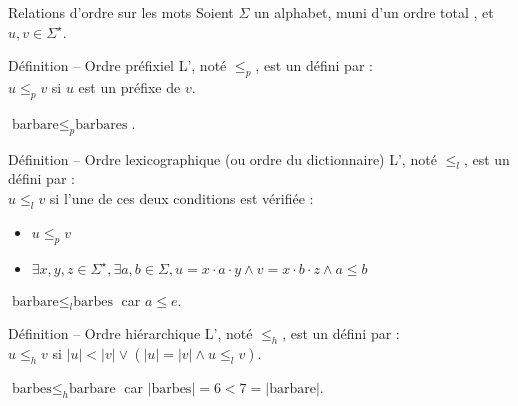 
\begingroup

\begin{frame}{Relations d'ordre sur les mots}
  \vspace{-1mm}
  Soient $\Sigma$ un alphabet, muni d'un ordre total \structure{$\le$}, et $u, v \in \Sigma^\star$.

  \begin{block}{Définition -- Ordre préfixiel}
    \vspace{-1mm}
    L', noté \alert{$\le_p$}, est un  défini par : \\
    \alert{$u \le_p v$} si \alert{$u$ est un préfixe de $v$}.

     $\text{barbare} \le_p \text{barbares}$. 
  \end{block}
  \pause
  \vspace{-1mm}
  \begin{block}{Définition -- Ordre lexicographique (ou ordre du dictionnaire)}
    \vspace{-1mm}
    L', noté \alert{$\le_l$}, est un  défini par :\\
    \alert{$u \le_l v$} si l'une de ces deux conditions est vérifiée :
    \begin{itemize}
    \item \alert{$u \le_p v$}
    \item \alert{$\exists x, y, z \in \Sigma^\star, \exists a, b \in \Sigma, u = x\cdot a\cdot y \land v = x\cdot b\cdot z \land a \le b$}
    \end{itemize}

     $\text{barbare} \le_l \text{barbes}$ car $a \le e$. 
  \end{block}
  \pause
  \vspace{-1mm}
  \begin{block}{Définition -- Ordre hiérarchique}
    \vspace{-1mm}
    L', noté \alert{$\le_h$}, est un  défini par :\\
    \alert{$u \le_h v$} si \alert{$|u| < |v| \lor (|u| = |v| \land u \le_l v)$}.

     $\text{barbes} \le_h \text{barbare}$ car $|\text{barbes}| = 6 < 7 = |\text{barbare}|$. 
  \end{block}
\end{frame}
\endgroup
